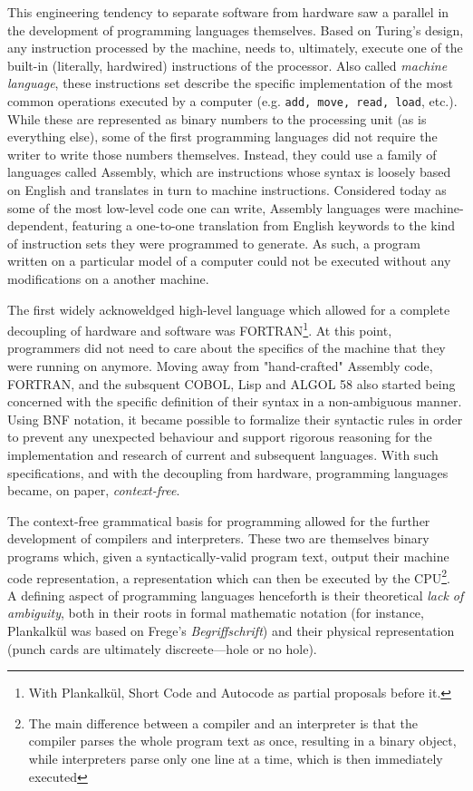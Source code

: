 This engineering tendency to separate software from hardware saw a parallel in the development of programming languages themselves. Based on Turing's design, any instruction processed by the machine, needs to, ultimately, execute one of the built-in (literally, hardwired) instructions of the processor. Also called \emph{machine language}, these instructions set describe the specific implementation of the most common operations executed by a computer (e.g. \lstinline{add, move, read, load}, etc.). While these are represented as binary numbers to the processing unit (as is everything else), some of the first programming languages did not require the writer to write those numbers themselves. Instead, they could use a family of languages called Assembly, which are instructions whose syntax is loosely based on English and translates in turn to machine instructions. Considered today as some of the most low-level code one can write, Assembly languages were machine-dependent, featuring a one-to-one translation from English keywords to the kind of instruction sets they were programmed to generate. As such, a program written on a particular model of a computer could not be executed without any modifications on a another machine.

The first widely acknoweldged high-level language which allowed for a complete decoupling of hardware and software was FORTRAN\footnote{With Plankalkül, Short Code and Autocode as partial proposals before it.}. At this point, programmers did not need to care about the specifics of the machine that they were running on anymore. Moving away from "hand-crafted" Assembly code, FORTRAN, and the subsquent COBOL, Lisp and ALGOL 58 also started being concerned with the specific definition of their syntax in a non-ambiguous manner. Using BNF notation, it became possible to formalize their syntactic rules in order to prevent any unexpected behaviour and support rigorous reasoning for the implementation and research of current and subsequent languages. With such specifications, and with the decoupling from hardware, programming languages became, on paper, \emph{context-free}.

The context-free grammatical basis for programming allowed for the further development of compilers and interpreters. These two are themselves binary programs which, given a syntactically-valid program text, output their machine code representation, a representation which can then be executed by the CPU\footnote{The main difference between a compiler and an interpreter is that the compiler parses the whole program text as once, resulting in a binary object, while interpreters parse only one line at a time, which is then immediately executed}. A defining aspect of programming languages henceforth is their theoretical \emph{lack of ambiguity}, both in their roots in formal mathematic notation (for instance, Plankalkül was based on Frege's \emph{Begriffschrift}) and their physical representation (punch cards are ultimately discreete—hole or no hole).

